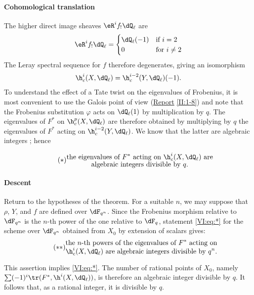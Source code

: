 \documentclass[oneside]{book}
\begin{document}
\paragraph{Cohomological translation}
The higher direct image sheaves $\eR^i f_!\dQ_\ell$ are 
\[
  \eR^i f_!\dQ_\ell = \begin{cases}
                       \dQ_\ell(-1) & \text{if $i = 2$} \\
                       0            & \text{for $i\ne 2$}
                     \end{cases}
\]
The Leray spectral sequence for $f$ therefore degenerates, giving an isomorphism 
\[
  \h_c^i(X,\dQ_\ell) = \h_c^{i-2}(Y,\dQ_\ell)(-1) \text{.}
\]
To understand the effect of a Tate twist on the eigenvalues of 
Frobenius, it is most convenient to use the Galois point of view 
(\hyperref[II]{Report} \ref{II:1-8}) and note that the Frobenius substitution 
$\varphi$ acts on $\dQ_\ell(1)$ by multiplication by $q$. The 
eigenvalues of $F^\ast$ on $\h_c^p(X,\dQ_\ell)$ are therefore obtained by 
multiplying by $q$ the eigenvalues of $F^\ast$ acting on $\h_c^{i-2}(Y,\dQ_\ell)$. We 
know that the latter are algebraic integers \cite[XXI 5.2.2]{sga7}; hence 

\begin{equation*}\tag{$*$}\label{VI:eq:*}
  \substack{\displaystyle\text{the eigenvalues of $F^\ast$ acting on $\h_c^i(X,\dQ_\ell)$ are} \\
  \displaystyle\text{algebraic integers divisible by $q$.}}
\end{equation*}


\paragraph{Descent}
Return to the hypotheses of the theorem. For a suitable $n$, we may 
suppose that $\rho$, $Y$, and $f$ are defined over $\dF_{q^n}$. Since the 
Frobenius morphism relative to $\dF_{q^n}$ is the $n$-th power of the one 
relative to $\dF_q$, statement \eqref{VI:eq:*} for the scheme over 
$\dF_{q^n}$ obtained from $X_0$ by extension of scalars gives: 
\begin{equation*}\tag{$**$}\label{VI:eq:**}
  \substack{\displaystyle\text{the $n$-th powers of the eigenvalues of $F^\ast$ acting on} \\ \displaystyle\text{$\h_c^i(X,\dQ_\ell)$ are algebraic integers divisible by $q^n$.}}
\end{equation*}

This assertion implies \eqref{VI:eq:*}. The number of rational points of 
$X_0$, namely $\sum (-1)^i \tr(F^\ast,\h^i(X,\dQ_\ell))$, is therefore an 
algebraic integer divisible by $q$. It follows that, as a rational integer, 
it is divisible by $q$. 
\end{document}
